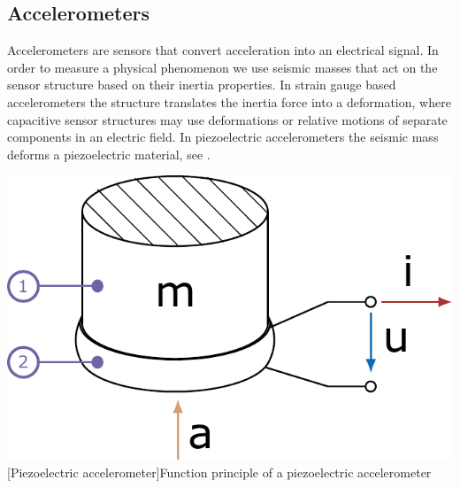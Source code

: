 \subsection{Accelerometers}

Accelerometers are sensors that convert acceleration into an electrical signal. In order to measure a physical phenomenon we use seismic masses that act on the sensor structure based on their inertia properties. In strain gauge based accelerometers the structure translates the inertia force into a deformation, where capacitive sensor structures may use deformations or relative motions of separate components in an electric field. In piezoelectric accelerometers the seismic mass deforms a piezoelectric material, see .
\\[4ex]
\begin{minipage}{\linewidth}
\centering
\begin{minipage}[b]{0.35\textwidth}
  \centering
  \includegraphics[scale=0.5]{figures/measurement/sensors/piezo_sensor}
  [Piezoelectric accelerometer]{Function principle of a piezoelectric accelerometer%
  \label{fig:piezo_sensor}}
\end{minipage}
\hspace{4em}
\begin{minipage}[b]{0.3\textwidth}
  \centering
  \footnotesize
  \def\circlabel#1#2{%
    \begin{tikzpicture}[%
      x=1em,y=1ex,
      baseline={([yshift=3] N.south)},
      font={\fontsize{6pt}{6.2pt}\selectfont},
      ]%
      \node[%
        circle, fill=white, draw=#1, line width=1pt,
        inner sep=2pt, minimum size=8pt, align=center,
        ] (N) {#2};
      \end{tikzpicture}
}
\end{minipage}
\end{minipage}
